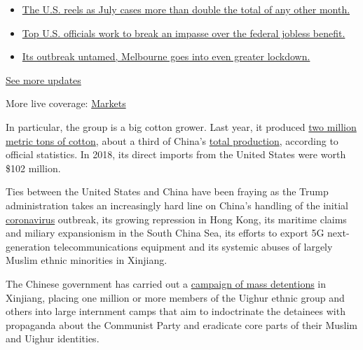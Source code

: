 \begin{itemize}
\tightlist
\item
  \href{https://www.nytimes.com/2020/08/01/world/coronavirus-covid-19.html?action=click\&pgtype=Article\&state=default\&region=MAIN_CONTENT_1\&context=storylines_live_updates\#link-34047410}{The
  U.S. reels as July cases more than double the total of any other
  month.}
\item
  \href{https://www.nytimes.com/2020/08/01/world/coronavirus-covid-19.html?action=click\&pgtype=Article\&state=default\&region=MAIN_CONTENT_1\&context=storylines_live_updates\#link-780ec966}{Top
  U.S. officials work to break an impasse over the federal jobless
  benefit.}
\item
  \href{https://www.nytimes.com/2020/08/01/world/coronavirus-covid-19.html?action=click\&pgtype=Article\&state=default\&region=MAIN_CONTENT_1\&context=storylines_live_updates\#link-2bc8948}{Its
  outbreak untamed, Melbourne goes into even greater lockdown.}
\end{itemize}

\href{https://www.nytimes.com/2020/08/01/world/coronavirus-covid-19.html?action=click\&pgtype=Article\&state=default\&region=MAIN_CONTENT_1\&context=storylines_live_updates}{See
more updates}

More live coverage:
\href{https://www.nytimes.com/live/2020/07/31/business/stock-market-today-coronavirus?action=click\&pgtype=Article\&state=default\&region=MAIN_CONTENT_1\&context=storylines_live_updates}{Markets}

In particular, the group is a big cotton grower. Last year, it produced
\href{http://www.xjbt.gov.cn/c/2020-04-26/7346731.shtml?ad_check=1}{two
million metric tons of cotton}, about a third of China's
\href{http://www.stats.gov.cn/tjsj/zxfb/201912/t20191217_1718007.html}{total
production}, according to official statistics. In 2018, its direct
imports from the United States were worth \$102 million.

Ties between the United States and China have been fraying as the Trump
administration takes an increasingly hard line on China's handling of
the initial
\href{https://www.nytimes.com/news-event/coronavirus}{coronavirus}
outbreak, its growing repression in Hong Kong, its maritime claims and
miliary expansionism in the South China Sea, its efforts to export 5G
next-generation telecommunications equipment and its systemic abuses of
largely Muslim ethnic minorities in Xinjiang.

The Chinese government has carried out a
\href{https://www.nytimes.com/interactive/2019/11/16/world/asia/china-xinjiang-documents.html}{campaign
of mass detentions} in Xinjiang, placing one million or more members of
the Uighur ethnic group and others into large internment camps that aim
to indoctrinate the detainees with propaganda about the Communist Party
and eradicate core parts of their Muslim and Uighur identities.

